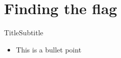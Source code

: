 
\section{Finding the flag}

\begin{frame}{Title}{Subtitle}
    \begin{itemize}
        \item This is a bullet point
    \end{itemize}
\end{frame}
